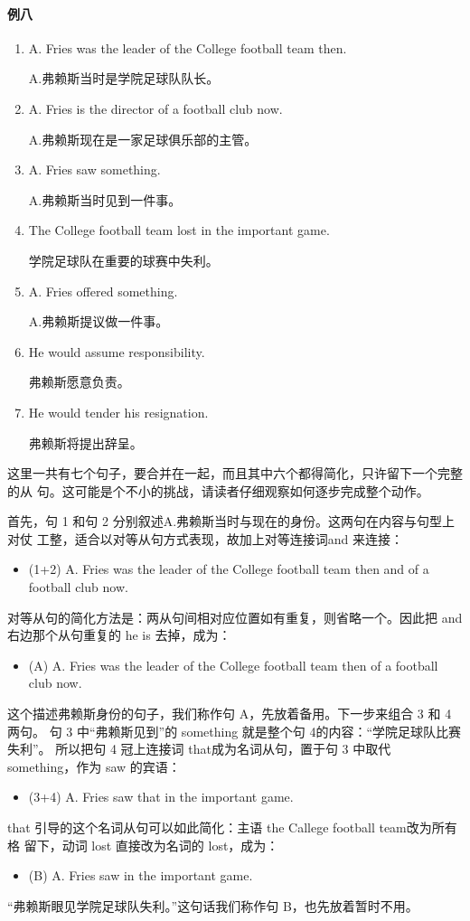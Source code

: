 \paragraph{例八}

\begin{enumerate}
\item A. Fries was the leader of the College football team then.

  A.弗赖斯当时是学院足球队队长。
\item A. Fries is the director of a football club now.

  A.弗赖斯现在是一家足球俱乐部的主管。
\item A. Fries saw something.

  A.弗赖斯当时见到一件事。
\item The College football team lost in the important game.

  学院足球队在重要的球赛中失利。
\item A. Fries offered something.

  A.弗赖斯提议做一件事。
\item He would assume responsibility.

  弗赖斯愿意负责。
\item He would tender his resignation.

  弗赖斯将提出辞呈。
\end{enumerate}

这里一共有七个句子，要合并在一起，而且其中六个都得简化，只许留下一个完整的从
句。这可能是个不小的挑战，请读者仔细观察如何逐步完成整个动作。

首先，句 1 和句 2 分别叙述A.弗赖斯当时与现在的身份。这两句在内容与句型上对仗
工整，适合以对等从句方式表现，故加上对等连接词and 来连接：
\begin{itemize}
\item (1+2) A. Fries was the leader of the College football team then and
   of a football club now.
\end{itemize}
对等从句的简化方法是：两从句间相对应位置如有重复，则省略一个。因此把 and
右边那个从句重复的 he is 去掉，成为：
\begin{itemize}
\item (A) A. Fries was the leader of the College football team then  of a football club now.
\end{itemize}
这个描述弗赖斯身份的句子，我们称作句 A，先放着备用。下一步来组合 3 和 4两句。
句 3 中“弗赖斯见到”的 something 就是整个句 4的内容：“学院足球队比赛失利”。
所以把句 4 冠上连接词 that成为名词从句，置于句 3 中取代 something，作为 saw
的宾语：
\begin{itemize}
\item (3+4) A. Fries saw that  in the important
  game.
\end{itemize}
that 引导的这个名词从句可以如此简化：主语 the Callege football team改为所有格
留下，动词 lost 直接改为名词的 lost，成为：
\begin{itemize}
\item (B) A. Fries saw  in the important
  game.
\end{itemize}
“弗赖斯眼见学院足球队失利。”这句话我们称作句 B，也先放着暂时不用。

